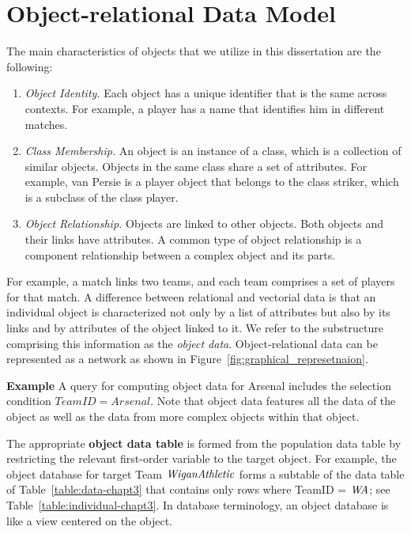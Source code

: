  	\section{Object-relational Data Model}
 	 The main 
 	 characteristics of objects that we utilize in this dissertation are the following:
 	 \begin{enumerate}
 	 	\item {\em Object Identity.} Each object has a unique identifier that is the same across contexts. For example, a player has a name that identifies him in different matches.
 	 	\item  {\em Class Membership.} An object is an instance of a class, which is a collection of similar objects. Objects in the same class share a set of attributes. For example, van Persie is a player object that belongs to the class striker, which is a subclass of the  class player.
 	 	\item{\em Object Relationship.} Objects are linked  to other objects. Both objects and their links have attributes. A common type of object relationship is a component relationship between a complex object and its parts.
 	 \end{enumerate}
 	 
 	 For example, a match links two teams, and each team comprises a set of players for that match. A difference between relational and vectorial data is that an individual object is characterized not only by a list of attributes but also by its links and by attributes of the object linked to it. We refer to the substructure comprising this information as the {\em object data}. Object-relational data can be represented as a network as shown in Figure~\ref{fig:graphical_represetnaion}.
 	 
 	 \textbf{Example} A query for computing object data for Arsenal includes the selection condition $TeamID=Arsenal$. Note that object data features all the data of the object as well as the data from more complex objects within that object.
 	 
 	 
 	 The appropriate \textbf{object data table} is formed from the population data table by restricting the relevant first-order variable to the target object. 
 	 For example, the object database for target Team $\it{Wigan Athletic}$ 
 	 forms a subtable of the data table of Table~\ref{table:data-chapt3} that contains only rows where 
 	 TeamID = $\it{WA}$; see Table~\ref{table:individual-chapt3}. In database terminology, an object database is like a view centered on the object.
 	 
